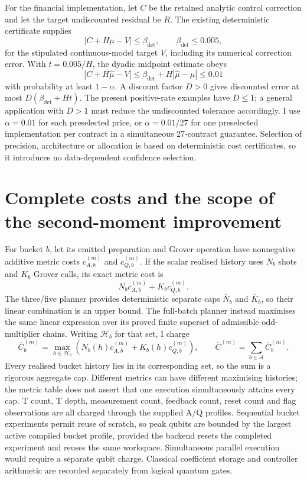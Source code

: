 For the financial implementation, let \(C\) be the retained analytic control correction and let the target undiscounted residual be \(R\). The existing deterministic certificate supplies
\[
 |C+H\mu-V|\leq\beta_{\mathrm{det}},
 \qquad \beta_{\mathrm{det}}\leq0.005,
\]
for the stipulated continuous-model target \(V\), including its numerical correction error. With \(t=0.005/H\), the dyadic midpoint estimate obeys
\[
 |C+H\widehat\mu-V|
 \leq\beta_{\mathrm{det}}+H|\widehat\mu-\mu|
 \leq0.01
\]
with probability at least \(1-\alpha\). A discount factor \(D>0\) gives discounted error at most \(D(\beta_{\mathrm{det}}+Ht)\). The present positive-rate examples have \(D\leq1\); a general application with \(D>1\) must reduce the undiscounted tolerance accordingly. I use \(\alpha=0.01\) for each preselected price, or \(\alpha=0.01/27\) for one preselected implementation per contract in a simultaneous 27-contract guarantee. Selection of precision, architecture or allocation is based on deterministic cost certificates, so it introduces no data-dependent confidence selection.

\section{Complete costs and the scope of the second-moment improvement}
\label{sec:dyadic-cost}

For bucket \(b\), let its emitted preparation and Grover operation have nonnegative additive metric costs \(c_{A,b}^{(m)}\) and \(c_{Q,b}^{(m)}\). If the scalar realised history uses \(N_b\) shots and \(K_b\) Grover calls, its exact metric cost is
\[
 N_bc_{A,b}^{(m)}+K_bc_{Q,b}^{(m)}.
\]
The three/five planner provides deterministic separate caps \(\overline N_b\) and \(\overline K_b\), so their linear combination is an upper bound. The full-batch planner instead maximises the same linear expression over its proved finite superset of admissible odd-multiplier chains. Writing \(\mathcal H_b\) for that set, I charge
\[
 \overline C_b^{(m)}=
 \max_{h\in\mathcal H_b}
 \left(N_b(h)c_{A,b}^{(m)}+K_b(h)c_{Q,b}^{(m)}\right),
 \qquad \overline C^{(m)}=\sum_{b\in\mathcal A}\overline C_b^{(m)}.
 \tag{D6}\label{eq:dyadic-metric-cost}
\]
Every realised bucket history lies in its corresponding set, so the sum is a rigorous aggregate cap. Different metrics can have different maximising histories; the metric table does not assert that one execution simultaneously attains every cap. T count, T depth, measurement count, feedback count, reset count and flag observations are all charged through the supplied A/Q profiles. Sequential bucket experiments permit reuse of scratch, so peak qubits are bounded by the largest active compiled bucket profile, provided the backend resets the completed experiment and reuses the same workspace. Simultaneous parallel execution would require a separate qubit charge. Classical coefficient storage and controller arithmetic are recorded separately from logical quantum gates.

